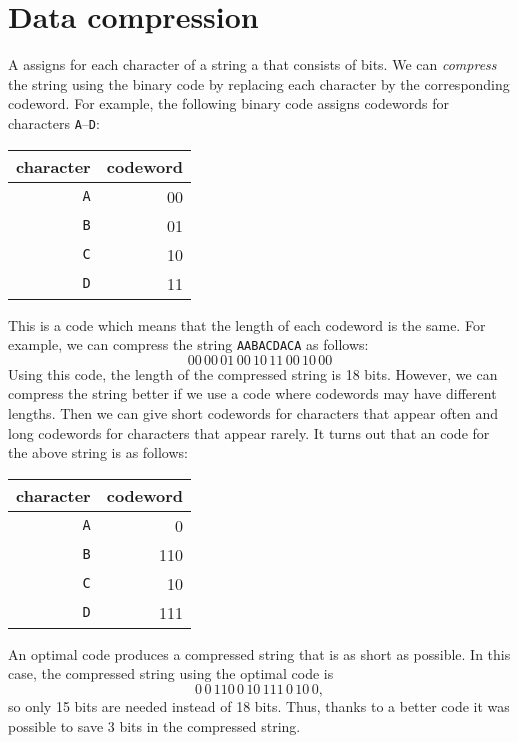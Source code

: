 \section{Data compression}


A  assigns for each character
of a string a  that consists of bits.
We can \emph{compress} the string using the binary code
by replacing each character by the
corresponding codeword.
For example, the following binary code
assigns codewords for characters
\texttt{A}–\texttt{D}:
\begin{center}
\begin{tabular}{rr}
character & codeword \\
\hline
\texttt{A} & 00 \\
\texttt{B} & 01 \\
\texttt{C} & 10 \\
\texttt{D} & 11 \\
\end{tabular}
\end{center}
This is a  code
which means that the length of each
codeword is the same.
For example, we can compress the string
\texttt{AABACDACA} as follows:
\[00\,00\,01\,00\,10\,11\,00\,10\,00\]
Using this code, the length of the compressed
string is 18 bits.
However, we can compress the string better
if we use a  code
where codewords may have different lengths.
Then we can give short codewords for
characters that appear often
and long codewords for characters
that appear rarely.
It turns out that an  code
for the above string is as follows:
\begin{center}
\begin{tabular}{rr}
character & codeword \\
\hline
\texttt{A} & 0 \\
\texttt{B} & 110 \\
\texttt{C} & 10 \\
\texttt{D} & 111 \\
\end{tabular}
\end{center}
An optimal code produces a compressed string
that is as short as possible.
In this case, the compressed string using
the optimal code is
\[0\,0\,110\,0\,10\,111\,0\,10\,0,\]
so only 15 bits are needed instead of 18 bits.
Thus, thanks to a better code it was possible to
save 3 bits in the compressed string.

